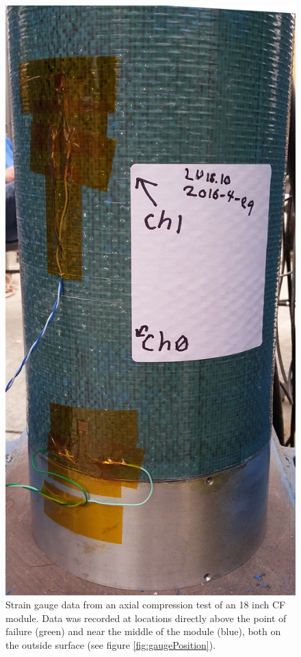 \documentclass{aiaa-tc}%
\begin{document}
\begin{figure}[t]
	\centering
	\parbox{0.35\linewidth}
	{
		\centering
		\includegraphics[width=\linewidth]{../img/LU16-10crush_close.jpg}
		\caption{Positioning of the strain gauges referred to in figure \ref{fig:strain}. Both are alligned with one of the pillars shown in figures \ref{fig:module} and \ref{fig:crush}.}
		\label{fig:gaugePosition}
	}
	\hfill
	\parbox{0.6\linewidth}
	{
		\centering
		
		\caption{Strain gauge data from an axial compression test of an 18 inch CF module. Data was recorded at locations directly above the point of failure (green) and near the middle of the module (blue), both on the outside surface (see figure \ref{fig:gaugePosition}).}
		\label{fig:strain}
	}
\end{figure}
\end{document}
